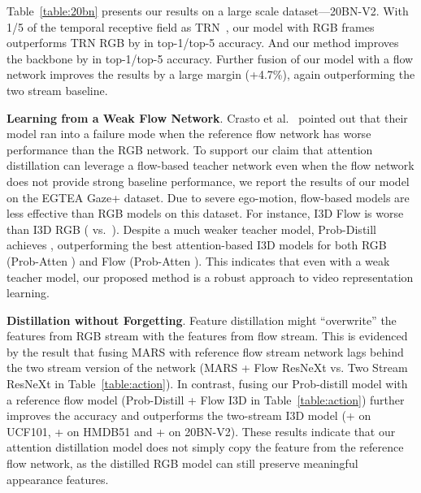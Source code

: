 \documentclass{bmvc2k}
\begin{document}
Table~\ref{table:20bn} presents our results on a large scale dataset---20BN-V2. With 1/5 of the temporal receptive field as TRN~\cite{zhou2017temporal}, our model with RGB frames outperforms TRN RGB by  in top-1/top-5 accuracy. And our method improves the backbone by  in top-1/top-5 accuracy. Further fusion of our model with a flow network improves the results by a large margin (+4.7\%), again outperforming the two stream baseline.  

\noindent \textbf{Learning from a Weak Flow Network}. Crasto et al.\ \cite{crasto2019mars} pointed out that their model ran into a failure mode when the reference flow network has worse performance than the RGB network. To support our claim that attention distillation can leverage a flow-based teacher network even when the flow network does not provide strong baseline performance, we report the results of our model on the EGTEA Gaze+ dataset. Due to severe ego-motion, flow-based models are less effective than RGB models on this dataset. For instance, I3D Flow is  worse than I3D RGB ( vs.\ ). Despite a much weaker teacher model, Prob-Distill achieves , outperforming the best attention-based I3D models for both RGB (Prob-Atten ) and Flow (Prob-Atten ). This indicates that even with a weak teacher model, our proposed method is a robust approach to video representation learning.

\noindent \textbf{Distillation without Forgetting}. Feature distillation might ``overwrite'' the features from RGB stream with the features from flow stream. This is evidenced by the result that fusing MARS with reference flow stream network lags behind the two stream version of the network (MARS + Flow ResNeXt vs. Two Stream ResNeXt in Table~\ref{table:action}). In contrast, fusing our Prob-distill model with a reference flow model (Prob-Distill + Flow I3D in Table~\ref{table:action}) further improves the accuracy and outperforms the two-stream I3D model (+ on UCF101, + on HMDB51 and + on 20BN-V2). These results indicate that our attention distillation model does not simply copy the feature from the reference flow network, as the distilled RGB model can still preserve meaningful appearance features. 
\end{document}
